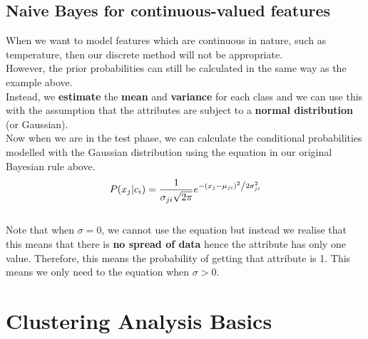 \documentclass[11pt,fleqn]{book} %
\begin{document}
\newpage
\section{Naive Bayes for continuous-valued features}
When we want to model features which are continuous in nature, such as temperature, then our discrete method will not be appropriate. \\

\noindent
However, the prior probabilities can still be calculated in the same way as the example above. \\

\noindent
Instead, we \textbf{estimate} the \textbf{mean} and \textbf{variance} for each class and we can use this with the assumption that the attributes are subject to a \textbf{normal distribution} (or Gaussian). \\

\noindent
Now when we are in the test phase, we can calculate the conditional probabilities modelled with the Gaussian distribution using the equation in our original Bayesian rule above. \\
\begin{equation}
P(x_j | c_i) = \frac{1}{{\sigma_{ji} \sqrt {2\pi } }}e^{{{ - \left( {x_j - \mu_{ji} } \right)^2 } \mathord{\left/ {\vphantom {{ - \left( {x - \mu } \right)^2 } {2\sigma ^2 }}} \right. \kern-\nulldelimiterspace} {2\sigma_{ji} ^2 }}}
\end{equation}
\ \\
\noindent
Note that when $\sigma = 0$, we cannot use the equation but instead we realise that this means that there is \textbf{no spread of data} hence the attribute has only one value. Therefore, this means the probability of getting that attribute is 1. This means we only need to the equation when $\sigma > 0$.



\chapter{Clustering Analysis Basics}
\end{document}
